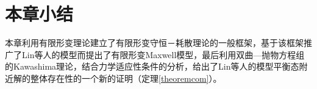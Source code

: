 

\section{本章小结}
本章利用有限形变理论建立了有限形变守恒－耗散理论的一般框架，基于该框架推广了Lin等人的模型而提出了有限形变Maxwell模型，最后利用双曲—抛物方程组的Kawashima理论，结合力学适应性条件的分析，给出了Lin等人的模型平衡态附近解的整体存在性的一个新的证明（定理\ref{theoremcom}）。


% 
% 
% 